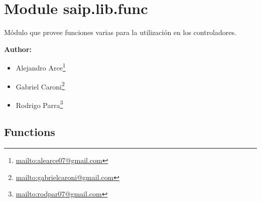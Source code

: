 %
%
%


\section{Module saip.lib.func}

    \label{saip:lib:func}
Módulo que provee funciones varias para la utilización en los 
controladores.

\textbf{Author:} \begin{itemize}
\setlength{\parskip}{0.6ex}
  \item Alejandro 
    Arce\footnote{\href{mailto:alearce07@gmail.com}{mailto:alearce07@gmail.com}}

  \item Gabriel 
    Caroni\footnote{\href{mailto:gabrielcaroni@gmail.com}{mailto:gabrielcaroni@gmail.com}}

  \item Rodrigo 
    Parra\footnote{\href{mailto:rodpar07@gmail.com}{mailto:rodpar07@gmail.com}}

\end{itemize}





  \subsection{Functions}

    \label{saip:lib:func:es_huerfano}

    \vspace{0.5ex}


